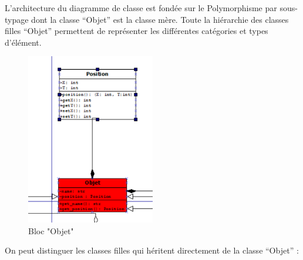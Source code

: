L'architecture du diagramme de classe est fondée sur le Polymorphisme par sous-typage dont la classe “Objet” est la classe mère.
Toute la hiérarchie des classes filles “Objet” permettent de représenter les différentes
catégories et types d’élément.
\begin{figure}[!h]
\centering
\includegraphics[width=0.5\textwidth]{pics/classe_objet.PNG}
\caption[Bloc "Objet"]{\label{figure_simple}Bloc "Objet"}
\end{figure}

On peut distinguer les classes filles qui héritent directement de la classe “Objet” :


